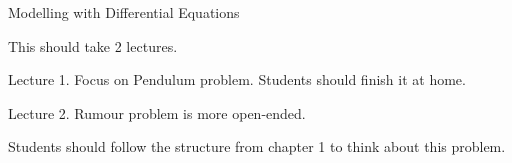 

\begin{module}{Modelling with Differential Equations}
	\label{model-odes}

	
	
\end{module}



\begin{lesson}

%	
%
%	

\end{lesson}




\newpage


\begin{annotation}
	\begin{goals}
		This should take 2 lectures.
		
		Lecture 1. Focus on Pendulum problem. Students should finish it at home.
		
		
		Lecture 2. Rumour problem is more open-ended. 
		
		Students should follow the structure from chapter 1 to think about this problem.
	\end{goals}
\end{annotation}
		
